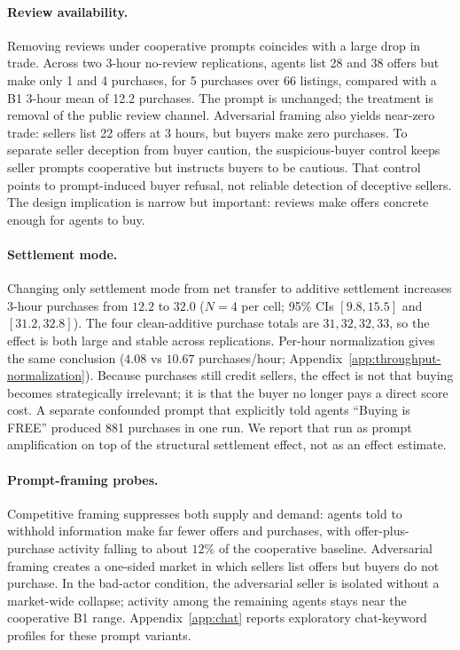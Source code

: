 \documentclass{article}
\begin{document}
\paragraph{Review availability.}
Removing reviews under cooperative prompts coincides with a large drop in trade.
Across two 3-hour no-review replications, agents list 28 and 38 offers but make only 1 and 4 purchases, for 5 purchases over 66 listings, compared with a B1 3-hour mean of 12.2 purchases.
The prompt is unchanged; the treatment is removal of the public review channel.
Adversarial framing also yields near-zero trade: sellers list 22 offers at 3 hours, but buyers make zero purchases.
To separate seller deception from buyer caution, the suspicious-buyer control keeps seller prompts cooperative but instructs buyers to be cautious.
That control points to prompt-induced buyer refusal, not reliable detection of deceptive sellers.
The design implication is narrow but important: reviews make offers concrete enough for agents to buy.

\paragraph{Settlement mode.}
Changing only settlement mode from net transfer to additive settlement increases 3-hour purchases from $12.2$ to $32.0$ ($N{=}4$ per cell; 95\% CIs $[9.8, 15.5]$ and $[31.2, 32.8]$).
The four clean-additive purchase totals are $31, 32, 32, 33$, so the effect is both large and stable across replications.
Per-hour normalization gives the same conclusion ($4.08$ vs $10.67$ purchases/hour; Appendix~\ref{app:throughput-normalization}).
Because purchases still credit sellers, the effect is not that buying becomes strategically irrelevant; it is that the buyer no longer pays a direct score cost.
A separate confounded prompt that explicitly told agents ``Buying is FREE'' produced 881 purchases in one run.
We report that run as prompt amplification on top of the structural settlement effect, not as an effect estimate.

\paragraph{Prompt-framing probes.}
Competitive framing suppresses both supply and demand: agents told to withhold information make far fewer offers and purchases, with offer-plus-purchase activity falling to about $12\%$ of the cooperative baseline.
Adversarial framing creates a one-sided market in which sellers list offers but buyers do not purchase.
In the bad-actor condition, the adversarial seller is isolated without a market-wide collapse; activity among the remaining agents stays near the cooperative B1 range.
Appendix~\ref{app:chat} reports exploratory chat-keyword profiles for these prompt variants.
\end{document}
